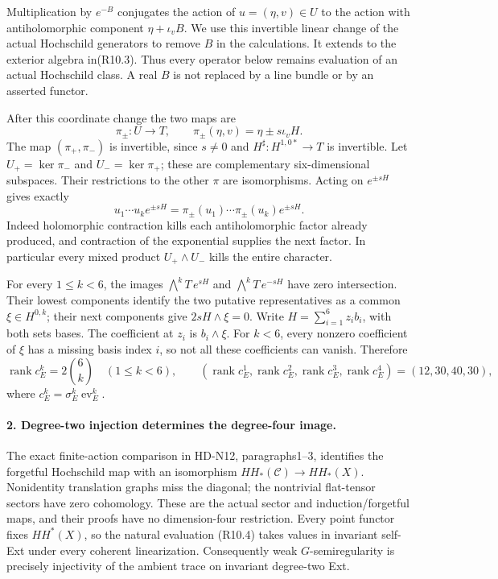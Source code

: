 Multiplication by $e^{-B}$ conjugates the action of
$u=(\eta,v)\in U$ to the action with antiholomorphic component
$\eta+\iota_vB$. We use this invertible linear change of the
actual Hochschild generators to remove $B$ in the calculations.
It extends to the exterior algebra in(R10.3). Thus every operator
below remains evaluation of an actual Hochschild class. A real
$B$ is not replaced by a line bundle or by an asserted functor.

After this coordinate change the two maps are
\[
 \pi_\pm:U\longrightarrow T,\qquad
                \pi_\pm(\eta,v)=\eta\pm s\iota_vH.
                                                               \tag{R10.5}
\]
The map $(\pi_+,\pi_-)$ is invertible, since $s\ne0$ and
$H^\sharp:H^{1,0*}\to T$ is invertible. Let
$U_+=\ker\pi_-$ and $U_-=\ker\pi_+$; these are complementary
six-dimensional subspaces. Their restrictions to the other
$\pi$ are isomorphisms. Acting on $e^{\pm sH}$ gives exactly
\[
       u_1\cdots u_k e^{\pm sH}
        =\pi_\pm(u_1)\cdots\pi_\pm(u_k)e^{\pm sH}.
                                                               \tag{R10.6}
\]
Indeed holomorphic contraction kills each antiholomorphic factor
already produced, and contraction of the exponential supplies
the next factor. In particular every mixed product
$U_+\wedge U_-$ kills the entire character.

For every $1\le k<6$, the images
$\bigwedge^kT\,e^{sH}$ and $\bigwedge^kT\,e^{-sH}$ have
zero intersection. Their lowest components identify the two
putative representatives as a common $\xi\in H^{0,k}$;
their next components give $2sH\wedge\xi=0$.
Write $H=\sum_{i=1}^6z_i b_i$, with both sets bases.
The coefficient at $z_i$ is $b_i\wedge\xi$. For $k<6$, every
nonzero coefficient of $\xi$ has a missing basis index $i$,
so not all these coefficients can vanish. Therefore
\[
 \operatorname{rank}c_E^k=2\binom6k\quad(1\le k<6),
 \qquad (\operatorname{rank}c_E^1,
         \operatorname{rank}c_E^2,
         \operatorname{rank}c_E^3,
         \operatorname{rank}c_E^4)=(12,30,40,30),
                                                               \tag{R10.7}
\]
where $c_E^k=\sigma_E^k\operatorname{ev}_E^k$.

\paragraph{2. Degree-two injection determines the degree-four image.}
The exact finite-action comparison in HD-N12, paragraphs1--3,
identifies the forgetful Hochschild map with an isomorphism
$HH_*(\mathcal C)\to HH_*(X)$. Nonidentity translation graphs
miss the diagonal; the nontrivial flat-tensor sectors have zero
cohomology. These are the actual sector and induction/forgetful
maps, and their proofs have no dimension-four restriction.
Every point functor fixes $HH^*(X)$, so the natural evaluation
(R10.4) takes values in invariant self-Ext under every coherent
linearization. Consequently weak $G$-semiregularity is precisely
injectivity of the ambient trace on invariant degree-two Ext.

